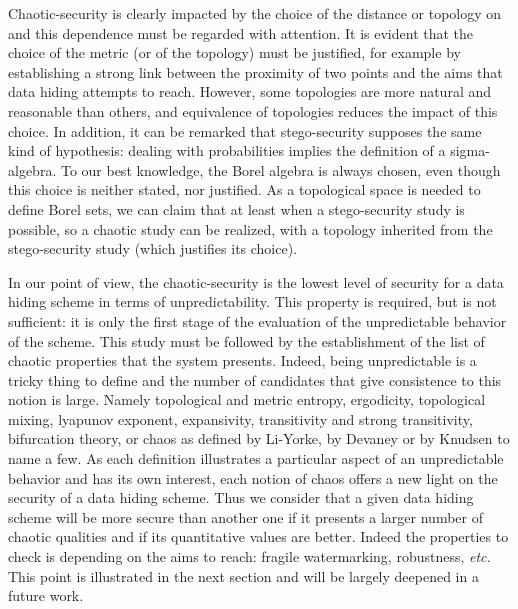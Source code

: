 \documentclass{llncs}
\begin{document}
Chaotic-security is clearly impacted by the choice of the distance or topology on  and this dependence must be regarded with attention. It is evident that the choice of the metric (or of the topology) must be justified, for example by establishing a strong link between the proximity of two points and the aims that data hiding attempts to reach.
However, some topologies are more natural and reasonable than others, and equivalence of topologies reduces the impact of this choice. In addition, it can be remarked that stego-security supposes the same kind of hypothesis: dealing with probabilities implies the definition of a sigma-algebra. To our best knowledge, the Borel algebra is always chosen, even though this choice is neither stated, nor justified. As a topological space is needed to define Borel sets, we can claim that at least when a stego-security study is possible, so a chaotic study can be realized, with a topology inherited from the stego-security study (which justifies its choice). 



\medskip

In our point of view, the chaotic-security is the lowest level of security for a data hiding scheme in terms of unpredictability. This property is required, but is not sufficient: it is only the first stage of the evaluation of the unpredictable behavior of the scheme. This study must be followed by the establishment of the list of chaotic properties that the system presents. Indeed, being unpredictable is a tricky thing to define and the number of candidates that give consistence to this notion is large. Namely topological and metric entropy, ergodicity, topological mixing, lyapunov exponent, expansivity, transitivity and strong transitivity, bifurcation theory, or chaos as defined by Li-Yorke, by Devaney or by Knudsen to name a few. As each definition illustrates a particular aspect of an unpredictable behavior and has its own interest, each notion of chaos offers a new light on the security of a data hiding scheme. Thus we consider that a given data hiding scheme will be more secure than another one if it presents a larger number of chaotic qualities and if its quantitative values are better. Indeed the properties to check is depending on the aims to reach: fragile watermarking, robustness, \emph{etc.} This point is illustrated in the next section and will be largely deepened in a future work. 
\end{document}
